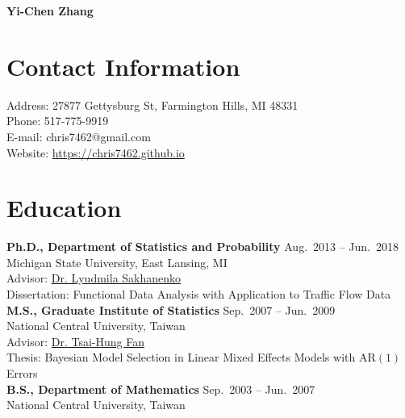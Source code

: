 \documentclass[a4paper,10pt,dvipdfmx]{article}
\begin{document}
\begin{center}
  {\huge \textbf{Yi-Chen Zhang}}
\end{center}

\section*{Contact Information}
\indent Address: 27877 Gettysburg St, Farmington Hills, MI 48331\\
\indent Phone: 517-775-9919\\
\indent E-mail: chris7462@gmail.com\\
\indent Website: \href{https://chris7462.github.io}{https://chris7462.github.io}

\section*{Education}
\indent \textbf{Ph.D., Department of Statistics and Probability} \hfill Aug.~2013 -- Jun.~2018\\
\indent Michigan State University, East Lansing, MI\\
\indent Advisor: \href{https://www.stt.msu.edu/users/luda/}{Dr. Lyudmila Sakhanenko}\\
\indent Dissertation: Functional Data Analysis with Application to Traffic Flow Data\\

\indent \textbf{M.S., Graduate Institute of Statistics} \hfill Sep.~2007 -- Jun.~2009\\
\indent National Central University, Taiwan\\
\indent Advisor: \href{http://www.stat.ncu.edu.tw/teacher/THFan/index.htm}{Dr. Tsai-Hung Fan}\\
\indent Thesis: Bayesian Model Selection in Linear Mixed Effects Models with AR$(1)$ Errors\\

\indent \textbf{B.S., Department of Mathematics} \hfill Sep.~2003 -- Jun.~2007\\
\indent National Central University, Taiwan
\end{document}
